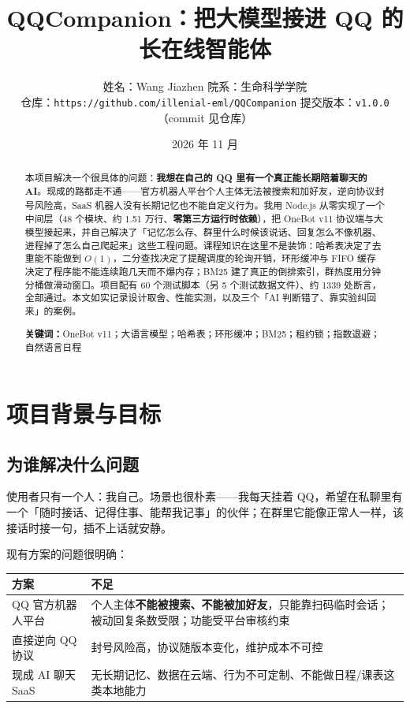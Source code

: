 \documentclass[11pt,a4paper]{ctexart}
\title{\bfseries QQCompanion：把大模型接进 QQ 的\\长在线智能体}
\author{姓名：Wang Jiazhen \quad 院系：生命科学学院 \\[4pt]
\small 仓库：\texttt{https://github.com/illenial-eml/QQCompanion} \quad 提交版本：\texttt{v1.0.0}（commit 见仓库）}
\date{2026 年 11 月}
\begin{document}
\maketitle
\thispagestyle{empty}

\begin{abstract}
\noindent
本项目解决一个很具体的问题：\textbf{我想在自己的 QQ 里有一个真正能长期陪着聊天的 AI}。现成的路都走不通——官方机器人平台个人主体无法被搜索和加好友，逆向协议封号风险高，SaaS 机器人没有长期记忆也不能自定义行为。我用 Node.js 从零实现了一个中间层（48 个模块、约 1.51 万行、\textbf{零第三方运行时依赖}），把 OneBot v11 协议端与大模型接起来，并自己解决了「记忆怎么存、群里什么时候该说话、回复怎么不像机器、进程掉了怎么自己爬起来」这些工程问题。课程知识在这里不是装饰：哈希表决定了去重能不能做到 $O(1)$，二分查找决定了提醒调度的轮询开销，环形缓冲与 FIFO 缓存决定了程序能不能连续跑几天而不爆内存；BM25 建了真正的倒排索引，群热度用分钟分桶做滑动窗口。项目配有 60 个测试脚本（另 5 个测试数据文件）、约 1339 处断言，全部通过。本文如实记录设计取舍、性能实测，以及三个「AI 判断错了、靠实验纠回来」的案例。

\vspace{4pt}
\noindent\textbf{关键词：}OneBot v11；大语言模型；哈希表；环形缓冲；BM25；租约锁；指数退避；自然语言日程
\end{abstract}

\tableofcontents
\newpage

\section{项目背景与目标}

\subsection{为谁解决什么问题}

使用者只有一个人：我自己。场景也很朴素——我每天挂着 QQ，希望在私聊里有一个「随时接话、记得住事、能帮我记事」的伙伴；在群里它能像正常人一样，该接话时接一句，插不上话就安静。

现有方案的问题很明确：

\begin{table}[H]
\centering\small
\begin{tabularx}{\textwidth}{@{}p{3.2cm}X@{}}
\toprule
方案 & 不足 \\
\midrule
QQ 官方机器人平台 & 个人主体\textbf{不能被搜索、不能被加好友}，只能靠扫码临时会话；被动回复条数受限；功能受平台审核约束 \\
直接逆向 QQ 协议 & 封号风险高，协议随版本变化，维护成本不可控 \\
现成 AI 聊天 SaaS & 无长期记忆、数据在云端、行为不可定制、不能做日程/课表这类本地能力 \\
\bottomrule
\end{tabularx}
\end{table}
\end{document}
